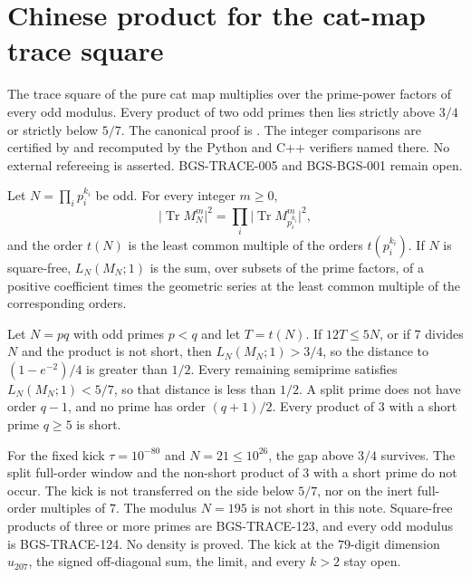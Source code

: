 \section{Chinese product for the cat-map trace square}
\label{sec:crt-composite-abel}
The trace square of the pure cat map multiplies over the prime-power
factors of every odd modulus. Every product of two odd primes then lies
strictly above \(3/4\) or strictly below \(5/7\). The canonical proof is
.
The integer comparisons are certified by
 and recomputed by the
Python and C++ verifiers named there. No external refereeing is asserted.
BGS-TRACE-005 and BGS-BGS-001 remain open.

\begin{theorem}
\label{thm:crt-composite-abel}
Let \(N=\prod_ip_i^{k_i}\) be odd. For every integer \(m\ge0\),
\[
\lvert\operatorname{Tr}M_N^m\rvert^2
=\prod_i\lvert\operatorname{Tr}M_{p_i^{k_i}}^m\rvert^2,
\]
and the order \(t(N)\) is the least common multiple of the orders
\(t(p_i^{k_i})\). If \(N\) is square-free, \(L_N(M_N;1)\) is the sum,
over subsets of the prime factors, of a positive coefficient times the
geometric series at the least common multiple of the corresponding orders.

Let \(N=pq\) with odd primes \(p<q\) and let \(T=t(N)\). If \(12T\le5N\),
or if \(7\) divides \(N\) and the product is not short, then
\(L_N(M_N;1)>3/4\), so the distance to \((1-e^{-2})/4\) is greater than
\(1/2\). Every remaining semiprime satisfies \(L_N(M_N;1)<5/7\), so that
distance is less than \(1/2\). A split prime does not have order \(q-1\),
and no prime has order \((q+1)/2\). Every product of \(3\) with a short
prime \(q\ge5\) is short.

For the fixed kick \(\tau=10^{-80}\) and \(N=21\le10^{26}\), the gap above
\(3/4\) survives. The split full-order window and the non-short product of
\(3\) with a short prime do not occur. The kick is not transferred on
the side below \(5/7\), nor on the inert full-order multiples of \(7\).
The modulus \(N=195\) is not short in this note. Square-free products of
three or more primes are BGS-TRACE-123, and every odd modulus is
BGS-TRACE-124. No density is proved. The kick at the \(79\)-digit
dimension \(u_{207}\), the signed off-diagonal sum, the limit, and every
\(k>2\) stay open.
\end{theorem}
